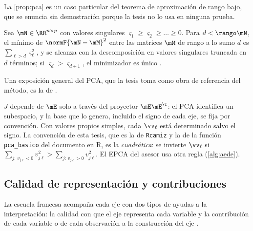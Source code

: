 La \cref{prop:pca} es un caso particular del teorema de aproximación de rango bajo, que se
enuncia sin demostración porque la tesis no lo usa en ninguna prueba.

\begin{teorema}\label{teo:eckart-young}
Sea $\mN\in\RR^{n\times p}$ con valores singulares $\varsigma_1\ge\varsigma_2\ge\dots\ge0$. Para
$d<\rango\mN$, el mínimo de $\normF{\mN-\mM}^2$ entre las matrices $\mM$ de rango a lo sumo $d$ es
$\sum_{\ell>d}\varsigma_\ell^2$, y se alcanza con la descomposición en valores singulares
truncada en $d$ términos; si $\varsigma_d>\varsigma_{d+1}$, el minimizador es único
\parencite{eckart_young_1936}.
\end{teorema}

Una exposición general del PCA, que la tesis toma como obra de referencia del método, es la de
\textcite{jolliffe_2002}.

\begin{observacion}\label{obs:signo-pca}
$J$ depende de $\mE$ solo a través del proyector $\mE\mE^{\T}$: el PCA identifica un subespacio, y
la base que lo genera, incluido el signo de cada eje, se fija por convención. Con valores propios
simples, cada $\vv_\ell$ está determinado salvo el signo. La convención de esta tesis, que es la
de \texttt{Rcamiz} y la de la función \texttt{pca\_basico} del documento en R, es la
\emph{cuadrática}: se invierte $\vv_\ell$ si
$\sum_{j:\,v_{j\ell}<0}v_{j\ell}^2>\sum_{j:\,v_{j\ell}>0}v_{j\ell}^2$. El EPCA del asesor usa otra
regla (\cref{alg:aede}).
\end{observacion}

\subsection{Calidad de representación y contribuciones}
\label{sec:cos2}

La escuela francesa acompaña cada eje con dos tipos de ayudas a la interpretación: la calidad con
que el eje representa cada variable y la contribución de cada variable o de cada observación a la
construcción del eje .

